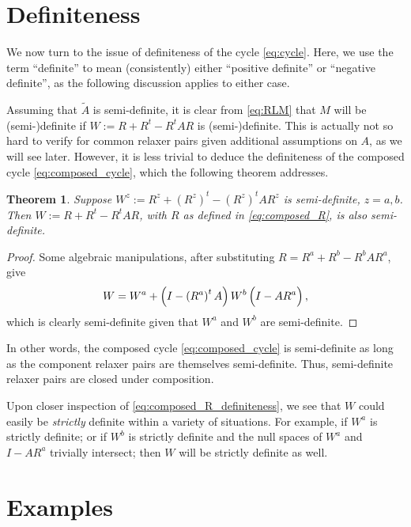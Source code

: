 \documentclass{article}
\newtheorem{theorem}{Theorem}
\begin{document}
\section{Definiteness}

We now turn to the issue of definiteness of the cycle \eqref{eq:cycle}. Here, we use the term ``definite'' to mean (consistently) either ``positive definite'' or ``negative definite'', as the following discussion applies to either case.

Assuming that $\widetilde{A}$ is semi-definite, it is clear from \eqref{eq:RLM} that $M$ will be (semi-)definite if $W := R + R^t - R^t A R$ is (semi-)definite. This is actually not so hard to verify for common relaxer pairs given additional assumptions on $A$, as we will see later. However, it is less trivial to deduce the definiteness of the composed cycle \eqref{eq:composed_cycle}, which the following theorem addresses.

\begin{theorem}
Suppose $W^z := R^z + \left( R^z \right)^t - \left( R^z \right)^t A R^z$ is semi-definite, $z = a,b$. Then $W := R + R^t - R^t A R$, with $R$ as defined in \eqref{eq:composed_R}, is also semi-definite.
\end{theorem}

\begin{proof}
Some algebraic manipulations, after substituting $R = R^a + R^b - R^b A R^a$, give
\begin{equation} \label{eq:composed_R_definiteness}
W = W^a + \left( I - \left( R^a \right)^t A \right) W^b \left( I - A R^a \vphantom{I - \left( R^a \right)^t A} \right),
\end{equation}
which is clearly semi-definite given that $W^a$ and $W^b$ are semi-definite.
\end{proof}
In other words, the composed cycle \eqref{eq:composed_cycle} is semi-definite as long as the component relaxer pairs are themselves semi-definite. Thus, semi-definite relaxer pairs are closed under composition.

Upon closer inspection of \eqref{eq:composed_R_definiteness}, we see that $W$ could easily be \emph{strictly} definite within a variety of situations. For example, if $W^a$ is strictly definite; or if $W^b$ is strictly definite and the null spaces of $W^a$ and $I - A R^a$ trivially intersect; then $W$ will be strictly definite as well.

\section{Examples}
\end{document}
